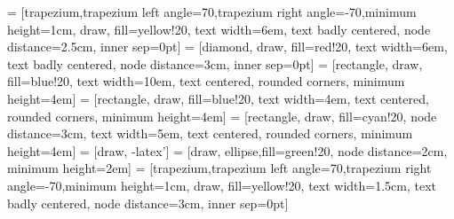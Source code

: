  = [trapezium,trapezium left angle=70,trapezium right angle=-70,minimum height=1cm, draw, fill=yellow!20, text width=6em, text badly centered, node distance=2.5cm, inner sep=0pt]
 = [diamond, draw, fill=red!20, 
    text width=6em, text badly centered, node distance=3cm, inner sep=0pt]
 = [rectangle, draw, fill=blue!20, 
    text width=10em, text centered, rounded corners, minimum height=4em]
     = [rectangle, draw, fill=blue!20, 
    text width=4em, text centered, rounded corners, minimum height=4em]
     = [rectangle, draw, fill=cyan!20, node distance=3cm,
    text width=5em, text centered, rounded corners, minimum height=4em]
     = [draw, -latex']
 = [draw, ellipse,fill=green!20, node distance=2cm,
    minimum height=2em]
     = [trapezium,trapezium left angle=70,trapezium right angle=-70,minimum height=1cm, draw, fill=yellow!20, text width=1.5cm, text badly centered, node distance=3cm, inner sep=0pt]
    
